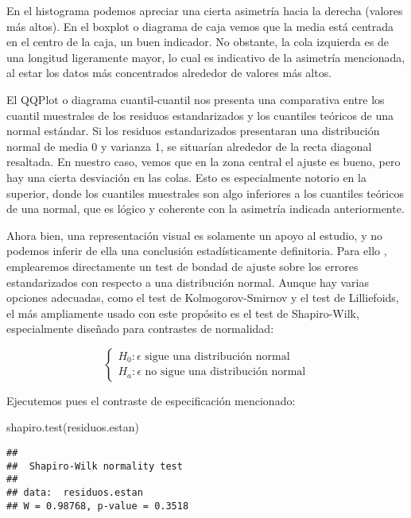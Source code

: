 \documentclass[
]{article}
\newenvironment{Shaded}{\begin{snugshade}}{\end{snugshade}}
\newcommand{\FunctionTok}[1]{\textcolor[rgb]{0.00,0.00,0.00}{#1}}
\newcommand{\NormalTok}[1]{#1}
\begin{document}
En el histograma podemos apreciar una cierta asimetría hacia la derecha
(valores más altos). En el boxplot o diagrama de caja vemos que la media
está centrada en el centro de la caja, un buen indicador. No obstante,
la cola izquierda es de una longitud ligeramente mayor, lo cual es
indicativo de la asimetría mencionada, al estar los datos más
concentrados alrededor de valores más altos.

El QQPlot o diagrama cuantil-cuantil nos presenta una comparativa entre
los cuantil muestrales de los residuos estandarizados y los cuantiles
teóricos de una normal estándar. Si los residuos estandarizados
presentaran una distribución normal de media 0 y varianza 1, se
situarían alrededor de la recta diagonal resaltada. En nuestro caso,
vemos que en la zona central el ajuste es bueno, pero hay una cierta
desviación en las colas. Esto es especialmente notorio en la superior,
donde los cuantiles muestrales son algo inferiores a los cuantiles
teóricos de una normal, que es lógico y coherente con la asimetría
indicada anteriormente.

Ahora bien, una representación visual es solamente un apoyo al estudio,
y no podemos inferir de ella una conclusión estadísticamente
definitoria. Para ello , emplearemos directamente un test de bondad de
ajuste sobre los errores estandarizados con respecto a una distribución
normal. Aunque hay varias opciones adecuadas, como el test de
Kolmogorov-Smirnov y el test de Lilliefoids, el más ampliamente usado
con este propósito es el test de Shapiro-Wilk, especialmente diseñado
para contrastes de normalidad:

\[
\begin{cases}
H_0: \epsilon\text{ sigue una distribución normal}\\
H_a: \epsilon\text{ no sigue una distribución normal}
\end{cases}
\]

Ejecutemos pues el contraste de especificación mencionado:

\begin{Shaded}
\begin{Highlighting}[]
\FunctionTok{shapiro.test}\NormalTok{(residuos.estan)}
\end{Highlighting}
\end{Shaded}

\begin{verbatim}
## 
##  Shapiro-Wilk normality test
## 
## data:  residuos.estan
## W = 0.98768, p-value = 0.3518
\end{verbatim}
\end{document}
